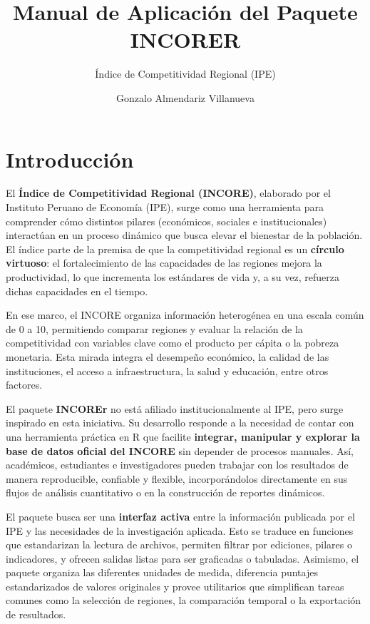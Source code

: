 \documentclass[
  11pt,
  letterpaper,
  DIV=11,
  numbers=noendperiod]{scrartcl}
\title{Manual de Aplicación del Paquete INCORER}
\subtitle{Índice de Competitividad Regional (IPE)}
\author{Gonzalo Almendariz Villanueva}
\date{}
\renewcommand*\contentsname{Tabla de contenidos}
\newcommand\contentsname{Tabla de contenidos}
\begin{document}
\maketitle

\renewcommand*\contentsname{Tabla de contenidos}
{
\hypersetup{linkcolor=}
\setcounter{tocdepth}{3}
\tableofcontents
}

\newpage

\section{Introducción}\label{introducciuxf3n}

El \textbf{Índice de Competitividad Regional (INCORE)}, elaborado por el
Instituto Peruano de Economía (IPE), surge como una herramienta para
comprender cómo distintos pilares (económicos, sociales e
institucionales) interactúan en un proceso dinámico que busca elevar el
bienestar de la población. El índice parte de la premisa de que la
competitividad regional es un \textbf{círculo virtuoso}: el
fortalecimiento de las capacidades de las regiones mejora la
productividad, lo que incrementa los estándares de vida y, a su vez,
refuerza dichas capacidades en el tiempo.

En ese marco, el INCORE organiza información heterogénea en una escala
común de 0 a 10, permitiendo comparar regiones y evaluar la relación de
la competitividad con variables clave como el producto per cápita o la
pobreza monetaria. Esta mirada integra el desempeño económico, la
calidad de las instituciones, el acceso a infraestructura, la salud y
educación, entre otros factores.

El paquete \textbf{INCOREr} no está afiliado institucionalmente al IPE,
pero surge inspirado en esta iniciativa. Su desarrollo responde a la
necesidad de contar con una herramienta práctica en R que facilite
\textbf{integrar, manipular y explorar la base de datos oficial del
INCORE} sin depender de procesos manuales. Así, académicos, estudiantes
e investigadores pueden trabajar con los resultados de manera
reproducible, confiable y flexible, incorporándolos directamente en sus
flujos de análisis cuantitativo o en la construcción de reportes
dinámicos.

El paquete busca ser una \textbf{interfaz activa} entre la información
publicada por el IPE y las necesidades de la investigación aplicada.
Esto se traduce en funciones que estandarizan la lectura de archivos,
permiten filtrar por ediciones, pilares o indicadores, y ofrecen salidas
listas para ser graficadas o tabuladas. Asimismo, el paquete organiza
las diferentes unidades de medida, diferencia puntajes estandarizados de
valores originales y provee utilitarios que simplifican tareas comunes
como la selección de regiones, la comparación temporal o la exportación
de resultados.
\end{document}
